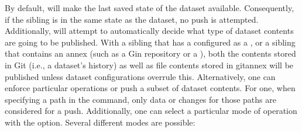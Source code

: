 \sphinxAtStartPar
By default,  will make the last saved state of the dataset
available. Consequently, if the sibling is in the same state as the dataset,
no push is attempted.
Additionally,  will attempt to automatically decide what type
of dataset contents are going to be published. With a sibling that has a
{\hyperref[\detokenize{glossary:term-special-remote}]{}} configured as a {\hyperref[\detokenize{glossary:term-publication-dependency}]{}},
or a sibling that contains an annex (such as a Gin repository or a
{\hyperref[\detokenize{glossary:term-Remote-Indexed-Archive-RIA-store}]{}}), both the contents
stored in Git (i.e., a dataset’s history) as well as file contents stored in
git\sphinxhyphen{}annex will be published unless dataset configurations overrule this.
Alternatively, one can enforce particular operations or push a subset of dataset
contents. For one, when specifying a path in the  command,
only data or changes for those paths are considered for a push.
Additionally, one can select a particular mode of operation with the  option.
Several different modes are possible:

